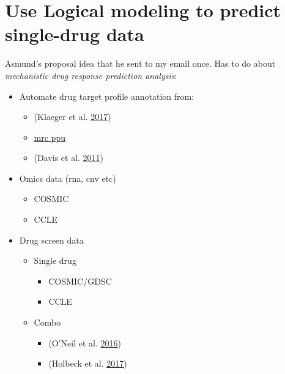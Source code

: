 \documentclass[
  12pt,
]{book}
\providecommand{\tightlist}{%
  \setlength{\itemsep}{0pt}\setlength{\parskip}{0pt}}
\begin{document}
\hypertarget{use-logical-modeling-to-predict-single-drug-data}{%
\section{Use Logical modeling to predict single-drug data}\label{use-logical-modeling-to-predict-single-drug-data}}

Asmund's proposal idea that he sent to my email once. Has to do about \emph{mechanistic drug response prediction analysis}:

\begin{itemize}
\tightlist
\item
  Automate drug target profile annotation from:

  \begin{itemize}
  \tightlist
  \item
    (Klaeger et al. \protect\hyperlink{ref-Klaeger2017}{2017})
  \item
    \href{http://www.kinase-screen.mrc.ac.uk/}{mrc ppu}
  \item
    (Davis et al. \protect\hyperlink{ref-Davis2011}{2011})
  \end{itemize}
\item
  Omics data (rna, cnv etc)

  \begin{itemize}
  \tightlist
  \item
    COSMIC
  \item
    CCLE
  \end{itemize}
\item
  Drug screen data

  \begin{itemize}
  \tightlist
  \item
    Single drug

    \begin{itemize}
    \tightlist
    \item
      COSMIC/GDSC
    \item
      CCLE
    \end{itemize}
  \item
    Combo

    \begin{itemize}
    \tightlist
    \item
      (O'Neil et al. \protect\hyperlink{ref-ONeil2016}{2016})
    \item
      (Holbeck et al. \protect\hyperlink{ref-Holbeck2017}{2017})
    \end{itemize}
  \end{itemize}
\end{itemize}
\end{document}
